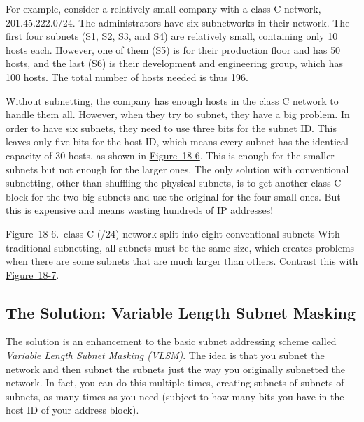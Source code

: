 For example, consider a relatively small company with a class C network,
201.45.222.0/24. The administrators have six subnetworks in their
network. The first four subnets (S1, S2, S3, and S4) are relatively
small, containing only 10 hosts each. However, one of them (S5) is for
their production floor and has 50 hosts, and the last (S6) is their
development and engineering group, which has 100 hosts. The total number
of hosts needed is thus 196.

Without subnetting, the company has enough hosts in the class C network
to handle them all. However, when they try to subnet, they have a big
problem. In order to have six subnets, they need to use three bits for
the subnet ID. This leaves only five bits for the host ID, which means
every subnet has the identical capacity of 30 hosts, as shown in
\protect\hyperlink{ch18s08.htmlux5cux23class_c_24_network_split_into_eight_conv}{Figure~18-6}.
This is enough for the smaller subnets but not enough for the larger
ones. The only solution with conventional subnetting, other than
shuffling the physical subnets, is to get another class C block for the
two big subnets and use the original for the four small ones. But this
is expensive and means wasting hundreds of IP addresses!

\protect\hypertarget{ch18s08.htmlux5cux23class_c_24_network_split_into_eight_conv}{}{}

\protect\hypertarget{ch18s08.htmlux5cux23I_mediaobject4_d1e20420}{}{}

Figure~18-6.~class C (/24) network split into eight conventional subnets
With traditional subnetting, all subnets must be the same size, which
creates problems when there are some subnets that are much larger than
others. Contrast this with
\protect\hyperlink{ch18s08.htmlux5cux23class_c_24_network_split_using_vlsm_usin}{Figure~18-7}.

\subsection[The Solution: Variable Length Subnet
Masking]{\texorpdfstring{\protect\hypertarget{ch18s08.htmlux5cux23the_solution_variable_length_subnet_mask}{}{}The
Solution: Variable Length Subnet
Masking}{The Solution: Variable Length Subnet Masking}}

\protect\hypertarget{ch18s08.htmlux5cux23idx-CHP-18-0743}{}{}The
solution is an enhancement to the basic subnet addressing scheme called
{\emph{Variable Length Subnet Masking (VLSM)}}. The idea is that you
subnet the network and then subnet the subnets just the way you
originally subnetted the network. In fact, you can do this multiple
times, creating subnets of subnets of subnets, as many times as you need
(subject to how many bits you have in the host ID of your address
block).

